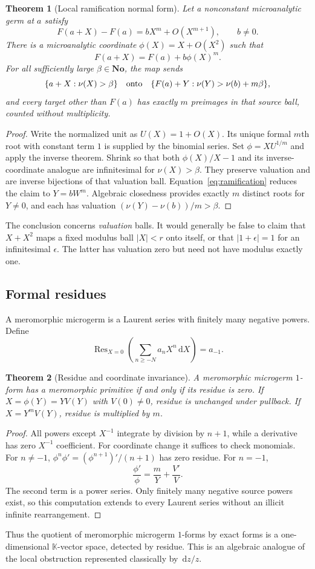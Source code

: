 \documentclass[11pt,oneside]{article}
\newtheorem{theorem}{Theorem}[section]
\theoremstyle{definition}\newtheorem{definition}[theorem]{Definition}
\newcommand{\No}{\mathbf{No}}
\newcommand{\K}{\mathbb K}
\newcommand{\Res}{\operatorname{Res}}
\newcommand{\dd}{\,\mathrm d}
\newcommand{\val}{\nu}
\begin{document}
\begin{theorem}[Local ramification normal form]\label{thm:ramification}
Let a nonconstant microanalytic germ at $a$ satisfy
\[
 F(a+X)-F(a)=bX^m+O(X^{m+1}),\qquad b\ne0.
\]
There is a microanalytic coordinate $\phi(X)=X+O(X^2)$ such that
\begin{equation}\label{eq:ramification}
 F(a+X)=F(a)+b\phi(X)^m.
\end{equation}
For all sufficiently large $\beta\in\No$, the map sends
\[
 \{a+X:\val(X)>\beta\}
 \quad\hbox{onto}\quad
 \{F(a)+Y:\val(Y)>\val(b)+m\beta\},
\]
and every target other than $F(a)$ has exactly $m$ preimages in that source ball, counted without multiplicity.
\end{theorem}
\begin{proof}
Write the normalized unit as $U(X)=1+O(X)$. Its unique formal $m$th root with constant term $1$ is supplied by the binomial series. Set $\phi=XU^{1/m}$ and apply the inverse theorem. Shrink so that both $\phi(X)/X-1$ and its inverse-coordinate analogue are infinitesimal for $\val(X)>\beta$. They preserve valuation and are inverse bijections of that valuation ball. Equation~\eqref{eq:ramification} reduces the claim to $Y=bW^m$. Algebraic closedness provides exactly $m$ distinct roots for $Y\ne0$, and each has valuation $(\val(Y)-\val(b))/m>\beta$.
\end{proof}
The conclusion concerns \emph{valuation} balls. It would generally be false to claim that $X+X^2$ maps a fixed modulus ball $|X|<r$ onto itself, or that $|1+\epsilon|=1$ for an infinitesimal $\epsilon$. The latter has valuation zero but need not have modulus exactly one.

\subsection{Formal residues}
A meromorphic microgerm is a Laurent series with finitely many negative powers. Define
\[
 \Res_{X=0}\left(\sum_{n\geq-N}a_nX^n\dd X\right)=a_{-1}.
\]
\begin{theorem}[Residue and coordinate invariance]\label{thm:formalres}
A meromorphic microgerm $1$-form has a meromorphic primitive if and only if its residue is zero. If $X=\phi(Y)=YV(Y)$ with $V(0)\ne0$, residue is unchanged under pullback. If $X=Y^mV(Y)$, residue is multiplied by $m$.
\end{theorem}
\begin{proof}
All powers except $X^{-1}$ integrate by division by $n+1$, while a derivative has zero $X^{-1}$ coefficient. For coordinate change it suffices to check monomials. For $n\ne-1$, $\phi^n\phi'=(\phi^{n+1})'/(n+1)$ has zero residue. For $n=-1$,
\[
 \frac{\phi'}{\phi}=\frac{m}{Y}+\frac{V'}{V}.
\]
The second term is a power series. Only finitely many negative source powers exist, so this computation extends to every Laurent series without an illicit infinite rearrangement.
\end{proof}
Thus the quotient of meromorphic microgerm $1$-forms by exact forms is a one-dimensional $\K$-vector space, detected by residue. This is an algebraic analogue of the local obstruction represented classically by $\dd z/z$.
\end{document}
